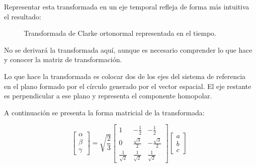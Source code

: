 Representar esta transformada en un eje temporal refleja de forma más intuitiva el resultado:
\begin{figure}[H]
	\centering
	\hspace*{-1.5cm}
	\caption{Transformada de Clarke ortonormal representada en el tiempo.}
\end{figure}



No se derivará la transformada aquí, aunque es necesario comprender lo que hace y conocer la matriz de transformación.

Lo que hace la transformada es colocar dos de los ejes del sistema de referencia en el plano formado por el círculo generado por el vector espacial. El eje restante es perpendicular a ese plano y representa el componente homopolar.

A continuación se presenta la forma matricial de la transformada:

\begin{equation}
    \begin{bmatrix}
        \alpha \\
        \beta \\
        \gamma
    \end{bmatrix}
    =
    \sqrt{\frac{2}{3}}
    \begin{bmatrix}
        1 & -\frac{1}{2} & -\frac{1}{2} \\
        0 & \frac{\sqrt{3}}{2} & -\frac{\sqrt{3}}{2} \\
        \frac{1}{\sqrt{2}} & \frac{1}{\sqrt{2}} & \frac{1}{\sqrt{2}}
    \end{bmatrix}
    \begin{bmatrix}
        a \\
        b \\
        c
    \end{bmatrix}
\end{equation}

